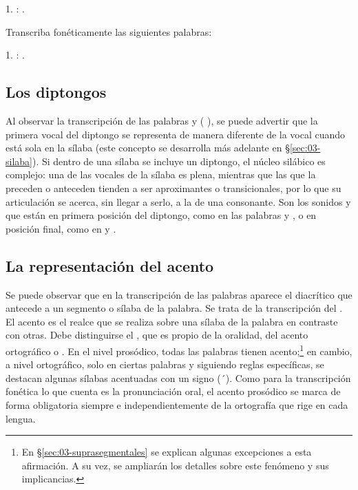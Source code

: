 \begin{ejercicio}
\begin{consignas}
            
            

        \begin{resuelto}
        1. : .
        \end{resuelto}
  \item Transcriba fonéticamente las siguientes palabras:


        \begin{resuelto}
        1. : .
        \end{resuelto}
\end{consignas}
\end{ejercicio}

\subsection{Los diptongos}

Al observar la transcripción de las palabras  y 
( ), se puede advertir que la primera vocal del
diptongo se representa de manera diferente de la vocal cuando está sola en la
sílaba (este concepto se desarrolla más adelante en §\ref{sec:03-silaba}). Si
dentro de una sílaba se incluye un diptongo, el núcleo silábico es complejo:
una de las vocales de la sílaba es plena, mientras que las que la preceden o
anteceden tienden a ser aproximantes o transicionales, por lo que su
articulación se acerca, sin llegar a serlo, a la de una consonante. Son
 los sonidos  y  que están en primera
posición del diptongo, como en las palabras  y , o en
posición final, como en  y .

\subsection{La representación del acento}

Se puede observar que en la transcripción de las palabras aparece el diacrítico
 que antecede a un segmento o sílaba de la palabra. Se trata de la
transcripción del . El acento es el realce que se realiza
sobre una sílaba de la palabra en contraste con otras. Debe distinguirse el
, que es propio de la oralidad, del acento
ortográfico o . En el nivel prosódico, todas las palabras tienen
acento;\footnote{En §\ref{sec:03-suprasegmentales} se explican algunas
excepciones a esta afirmación. A su vez, se ampliarán los detalles sobre este
fenómeno y sus implicancias.} en cambio, a nivel ortográfico, solo en ciertas
palabras y siguiendo reglas específicas, se destacan algunas sílabas acentuadas
con un signo (´). Como para la transcripción fonética lo que cuenta es la
pronunciación oral, el acento prosódico se marca de forma obligatoria siempre e
independientemente de la ortografía que rige en cada lengua.

